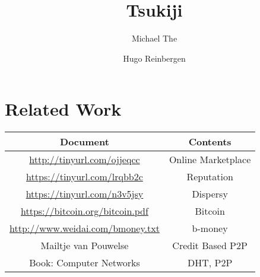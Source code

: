 \documentclass[]{article}
\title{Tsukiji}
\author{Michael The \and Hugo Reinbergen}
\begin{document}
\maketitle

\section*{Related Work}
\begin{tabular}{|c|c|}
 \hline
 Document & Contents  \\
 \hline
 \url{http://tinyurl.com/ojjeqcc} & Online Marketplace \\
 \url{https://tinyurl.com/lrqbb2c} & Reputation \\
 \url{https://tinyurl.com/n3v5jsy} & Dispersy \\
 \url{https://bitcoin.org/bitcoin.pdf} & Bitcoin \\
 \url{http://www.weidai.com/bmoney.txt} & b-money \\
 Mailtje van Pouwelse & Credit Based P2P \\
 Book: Computer Networks & DHT, P2P \\
 \hline
\end{tabular}




\tableofcontents
\newpage
\listoffigures










\begin{appendices}


\end{appendices}
\end{document}
